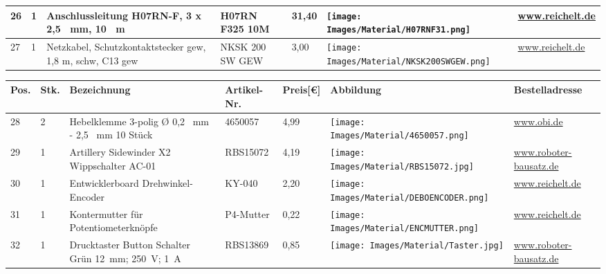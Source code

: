 \begin{center}
\begin{tabularx}{\textwidth}{|p{0.4cm}|p{0.4cm}|X|X|p{1cm}|X|X|}
		\hline
		26 & 1 & Anschlussleitung H07RN-F, 3 x 2,5 \ mm, 10 \ m &  H07RN F325 10M & 31,40 & \texttt{[image: Images/Material/H07RNF31.png]} & \href{https://www.reichelt.de/anschlussleitung-h07rn-f-3-x-2-5-mm-10-m-h07rn-f325-10m-p85894.html}{www.reichelt.de} \\
		\hline
		27 & 1 & Netzkabel, Schutzkontaktstecker gew, 1,8 m, schw, C13 gew & NKSK 200 SW GEW & 3,00  & \texttt{[image: Images/Material/NKSK200SWGEW.png]} & \href{https://www.reichelt.de/sg/de/netzkabel-schutzkontaktstecker-gew-1-8-m-schw-c13-gew-nksk-200-sw-gew-p113125.html}{www.reichelt.de} \\
		\hline

			\end{tabularx}


	\fontsize{8}{10}\selectfont
	\begin{tabularx}{\textwidth}{|p{0.4cm}|p{0.4cm}|X|X|p{1cm}|X|X|}
	\hline 
	\textbf{Pos.} & \textbf{Stk.} & \textbf{Bezeichnung} & \textbf{Artikel-Nr.}& \textbf{Preis[€]} & \textbf{Abbildung} & \textbf{Bestelladresse} \\ \hline		
	28 & 2 & Hebelklemme 3-polig Ø 0,2 \ mm - 2,5 \ mm 10 Stück & 4650057 & 4,99  & \texttt{[image: Images/Material/4650057.png]} & \href{https://www.obi.de/p/4650057/hebelklemme-3-polig-0-2-mm-2-5-mm-10-stueck}{www.obi.de} \\
	\hline
	29 & 1 & Artillery Sidewinder X2 Wippschalter AC-01 & RBS15072 & 4,19  & \texttt{[image: Images/Material/RBS15072.jpg]} & \href{https://www.roboter-bausatz.de/p/artillery-sidewinder-x2-wippschalter-ac-01}{www.roboter-bausatz.de} \\
	\hline
	30 & 1 & Entwicklerboard Drehwinkel-Encoder & KY-040 & 2,20  & \texttt{[image: Images/Material/DEBOENCODER.png]} & \href{https://www.reichelt.de/sg/de/entwicklerboards-drehwinkel-encoder-ky-040-debo-encoder-p282545.html}{www.reichelt.de} \\
	\hline
	31 & 1 & Kontermutter für Potentiometerknöpfe & P4-Mutter & 0,22  & \texttt{[image: Images/Material/ENCMUTTER.png]} & \href{https://www.reichelt.de/sg/de/kontermutter-fuer-potentiometerknoepfe-schwarz-p4-mutter-p13757.html}{www.reichelt.de} \\
	\hline
	32 & 1 & Drucktaster Button Schalter Grün 12\ mm; 250\ V; 1\ A  & RBS13869 & 0,85  & \texttt{[image: Images/Material/Taster.jpg]} & \href{https://www.roboter-bausatz.de/p/drucktaster-button-schalter-gruen-12mm-250v-1a}{www.roboter-bausatz.de} \\

\end{tabularx}
\end{center}

